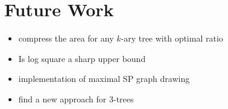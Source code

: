 \section{Future Work}\label{section:future_work}

\begin{itemize}
	\item compress the area for any $k$-ary tree with optimal ratio
	\item Is log square a sharp upper bound
	\item implementation of maximal SP graph drawing
	\item find a new approach for 3-trees
\end{itemize}